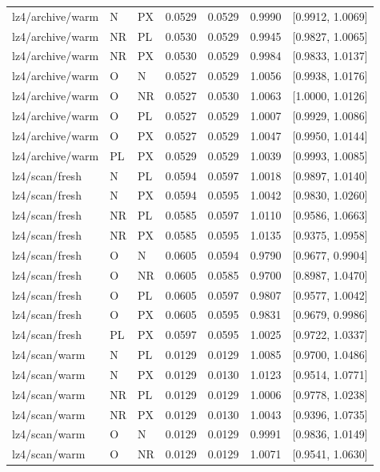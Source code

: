 \begin{longtable}{lllrrrr}
lz4/archive/warm & N & PX & 0.0529 & 0.0529 & 0.9990 & [0.9912, 1.0069] \\
lz4/archive/warm & NR & PL & 0.0530 & 0.0529 & 0.9945 & [0.9827, 1.0065] \\
lz4/archive/warm & NR & PX & 0.0530 & 0.0529 & 0.9984 & [0.9833, 1.0137] \\
lz4/archive/warm & O & N & 0.0527 & 0.0529 & 1.0056 & [0.9938, 1.0176] \\
lz4/archive/warm & O & NR & 0.0527 & 0.0530 & 1.0063 & [1.0000, 1.0126] \\
lz4/archive/warm & O & PL & 0.0527 & 0.0529 & 1.0007 & [0.9929, 1.0086] \\
lz4/archive/warm & O & PX & 0.0527 & 0.0529 & 1.0047 & [0.9950, 1.0144] \\
lz4/archive/warm & PL & PX & 0.0529 & 0.0529 & 1.0039 & [0.9993, 1.0085] \\
lz4/scan/fresh & N & PL & 0.0594 & 0.0597 & 1.0018 & [0.9897, 1.0140] \\
lz4/scan/fresh & N & PX & 0.0594 & 0.0595 & 1.0042 & [0.9830, 1.0260] \\
lz4/scan/fresh & NR & PL & 0.0585 & 0.0597 & 1.0110 & [0.9586, 1.0663] \\
lz4/scan/fresh & NR & PX & 0.0585 & 0.0595 & 1.0135 & [0.9375, 1.0958] \\
lz4/scan/fresh & O & N & 0.0605 & 0.0594 & 0.9790 & [0.9677, 0.9904] \\
lz4/scan/fresh & O & NR & 0.0605 & 0.0585 & 0.9700 & [0.8987, 1.0470] \\
lz4/scan/fresh & O & PL & 0.0605 & 0.0597 & 0.9807 & [0.9577, 1.0042] \\
lz4/scan/fresh & O & PX & 0.0605 & 0.0595 & 0.9831 & [0.9679, 0.9986] \\
lz4/scan/fresh & PL & PX & 0.0597 & 0.0595 & 1.0025 & [0.9722, 1.0337] \\
lz4/scan/warm & N & PL & 0.0129 & 0.0129 & 1.0085 & [0.9700, 1.0486] \\
lz4/scan/warm & N & PX & 0.0129 & 0.0130 & 1.0123 & [0.9514, 1.0771] \\
lz4/scan/warm & NR & PL & 0.0129 & 0.0129 & 1.0006 & [0.9778, 1.0238] \\
lz4/scan/warm & NR & PX & 0.0129 & 0.0130 & 1.0043 & [0.9396, 1.0735] \\
lz4/scan/warm & O & N & 0.0129 & 0.0129 & 0.9991 & [0.9836, 1.0149] \\
lz4/scan/warm & O & NR & 0.0129 & 0.0129 & 1.0071 & [0.9541, 1.0630] \\

\end{longtable}
